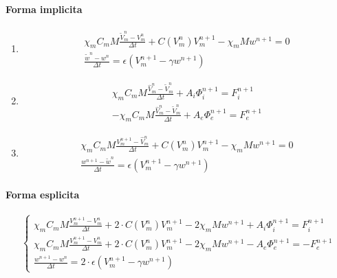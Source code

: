 \documentclass[a4paper]{article}
\theoremstyle{definition}
\begin{document}
\paragraph{Forma implicita}
\begin{enumerate}[label = \Roman*, align = Center]
	\item 
	\begin{equation}
	\begin{gathered}
	\chi_m C_m M \frac{\tilde{V}_m^n-V_m^n}{\Delta t} +  C(V_m^n) V_m^{n+1} - \chi_m M w^{n+1}= 0
	\\
	 \frac{\tilde{w}^n - w^n}{\Delta t} = \epsilon (V_m^{n+1}-\gamma w^{n+1})
	\end{gathered}
	\end{equation}
	\item 
	\begin{equation}
	\begin{gathered}
	\chi_m C_m M \frac{\hat{V}_m^n-\tilde{V}_m^n}{\Delta t} + A_i \Phi_i^{n+1}= F_i^{n+1}
	\\
	- \chi_m C_m M \frac{\hat{V}_m^n-\tilde{V}_m^n}{\Delta t} + A_e \Phi_e^{n+1}= F_e^{n+1}
	\end{gathered}
	\end{equation}
	\item 
	\begin{equation}
	\begin{gathered}
	\chi_m C_m M \frac{V_m^{n+1}-\hat{V}_m^n}{\Delta t} +  C(V_m^n) V_m^{n+1} - \chi_m M w^{n+1}= 0
	\\
	 \frac{w^{n+1} - \tilde{w}^n}{\Delta t} = \epsilon (V_m^{n+1}-\gamma w^{n+1})
	\end{gathered}
	\end{equation}
\end{enumerate}
\paragraph{Forma esplicita}
\begin{equation}
\begin{cases}
\chi_m C_m M \frac{V_m^{n+1}-V_m^{n}}{\Delta t} + 2\cdot C(V_m^n) V_m^{n+1} - 2 \chi_m M w^{n+1} + A_i \Phi_i ^{n+1} = F_i^{n+1} \\
\chi_m C_m M \frac{V_m^{n+1}-V_m^{n}}{\Delta t} + 2\cdot C(V_m^n) V_m^{n+1} - 2 \chi_m M w^{n+1} - A_e \Phi_e ^{n+1} =  -F_e^{n+1} \\
\frac{w^{n+1}-w^{n}}{\Delta t} = 2\cdot \epsilon(V_m^{n+1}-\gamma w^{n+1})
\end{cases}
\end{equation}
\end{document}
